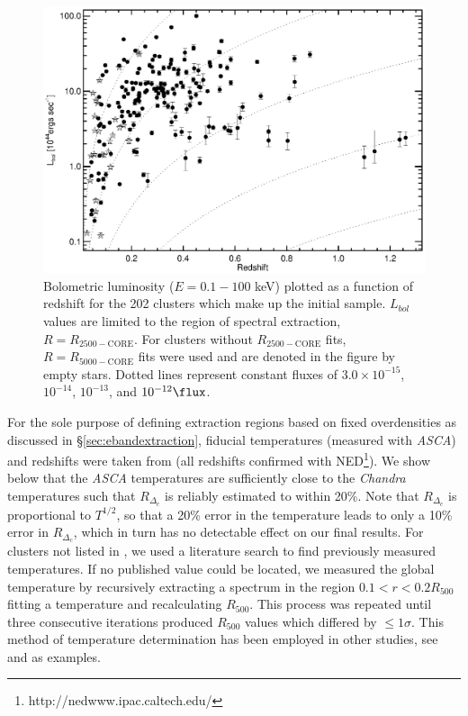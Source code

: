 \begin{figure}
\begin{center}
\includegraphics*[width=\textwidth, trim=0mm 0mm 0mm 0mm, clip]{eband_f1.eps}
\caption[Redshift distribution of bolometric luminosities for
  $T_{HBR}$ sample]{Bolometric luminosity ($E = 0.1-100$ keV) plotted
  as a function of redshift for the 202 clusters which make up the
  initial sample. $L_{bol}$ values are limited to the region of
  spectral extraction, $R=R_{2500-\mathrm{CORE}}$. For clusters
  without $R_{2500-\mathrm{CORE}}$ fits, $R=R_{5000-\mathrm{CORE}}$
  fits were used and are denoted in the figure by empty stars. Dotted
  lines represent constant fluxes of $3.0\times10^{-15}$, $10^{-14}$,
  $10^{-13}$, and $10^{-12} \flux$.}
\label{fig:lx_z}
\end{center}
\end{figure}

For the sole purpose of defining extraction regions based on fixed
overdensities as discussed in \S\ref{sec:ebandextraction}, fiducial
temperatures (measured with {\it ASCA}) and redshifts were taken from
\citet{hornerthesis} (all redshifts confirmed with
NED\footnote{http://nedwww.ipac.caltech.edu/}). We show below that the
{\it ASCA} temperatures are sufficiently close to the {\it Chandra}
temperatures such that $R_{\Delta_c}$ is reliably estimated to within
20\%. Note that $R_{\Delta_c}$ is proportional to $T^{1/2}$, so that a
20\% error in the temperature leads to only a 10\% error in
$R_{\Delta_c}$, which in turn has no detectable effect on our final
results. For clusters not listed in \citet{hornerthesis} , we used a
literature search to find previously measured temperatures. If no
published value could be located, we measured the global temperature
by recursively extracting a spectrum in the region $0.1<r<0.2 R_{500}$
fitting a temperature and recalculating $R_{500}$. This process was
repeated until three consecutive iterations produced $R_{500}$ values
which differed by $\leq 1\sigma$. This method of temperature
determination has been employed in other studies, see
\citet{2006MNRAS.372.1496S} and \citet{2006ApJS..162..304H} as examples.

